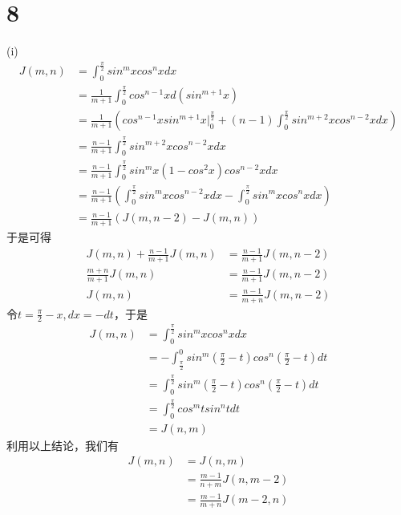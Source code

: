 \documentclass{article}
\begin{document}
\section*{8}
 (i)
\begin{align*}
  J(m,n) & = \int_{0}^{\frac{\pi}{2}} sin^m x cos^n x dx                                                                                                 \\
         & = \frac{1}{m + 1}\int_{0}^{\frac{\pi}{2}} cos^{n-1} x d(sin^{m + 1}x)                                                                         \\
         & = \frac{1}{m + 1}\left( cos^{n-1} x sin^{m + 1}x \bigg|_0^{\frac{\pi}{2}} + (n-1)\int_{0}^{\frac{\pi}{2}} sin^{m + 2}x cos^{n-2} x dx \right) \\
         & = \frac{n - 1}{m + 1} \int_{0}^{\frac{\pi}{2}} sin^{m + 2}x cos^{n-2} x dx                                                                    \\
         & = \frac{n - 1}{m + 1} \int_{0}^{\frac{\pi}{2}} sin^{m}x (1 - cos^2 x) cos^{n-2} x dx                                                          \\
         & = \frac{n - 1}{m + 1} \left(\int_{0}^{\frac{\pi}{2}} sin^{m}x cos^{n-2} x dx - \int_{0}^{\frac{\pi}{2}} sin^{m}x cos^{n} x dx\right)          \\
         & = \frac{n - 1}{m + 1} \left(J(m, n - 2) - J(m, n)\right)
\end{align*}
于是可得
\begin{align*}
  J(m,n) + \frac{n - 1}{m + 1} J(m, n) & = \frac{n - 1}{m + 1} J(m, n - 2) \\
  \frac{m + n}{m + 1} J(m, n)          & = \frac{n - 1}{m + 1} J(m, n - 2) \\
  J(m, n)                              & = \frac{n - 1}{m + n} J(m, n - 2)
\end{align*}
令$t = \frac{\pi}{2} - x, dx = -dt$，于是
\begin{align*}
  J(m, n) & = \int_{0}^{\frac{\pi}{2}} sin^m x cos^n x dx                                       \\
          & = - \int_{\frac{\pi}{2}}^{0} sin^m (\frac{\pi}{2} - t) cos^n (\frac{\pi}{2} - t) dt \\
          & = \int_{0}^{\frac{\pi}{2}} sin^m (\frac{\pi}{2} - t) cos^n (\frac{\pi}{2} - t) dt   \\
          & = \int_{0}^{\frac{\pi}{2}} cos^m t sin^n t dt                                       \\
          & = J(n, m)
\end{align*}
利用以上结论，我们有
\begin{align*}
  J(m, n) & = J(n, m)                         \\
          & = \frac{m - 1}{n + m} J(n, m - 2) \\
          & = \frac{m - 1}{m + n} J(m - 2, n)
\end{align*}
\end{document}
